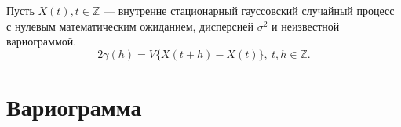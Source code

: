 Пусть $ X(t), t \in \mathbb{Z} $ --- внутренне стационарный гауссовский случайный процесс с нулевым математическим ожиданием, дисперсией $ \sigma^2 $ и неизвестной вариограммой.
\begin{equation*}
	2 \gamma(h) = V \{ X(t + h) - X(t) \}, ~ t,h \in \mathbb{Z}.
\end{equation*}


\section{Вариограмма} %
\label{sec:variogram}

